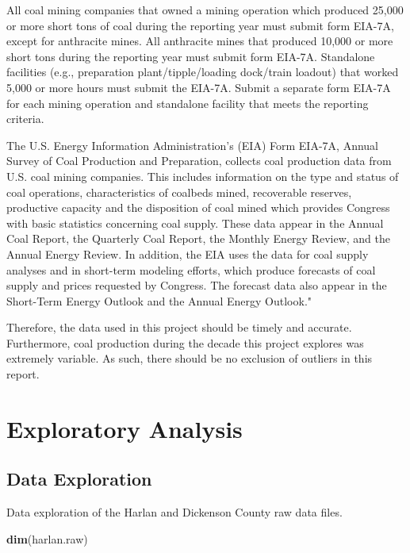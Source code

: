 \documentclass[12pt,]{article}
\newenvironment{Shaded}{\begin{snugshade}}{\end{snugshade}}
\newcommand{\KeywordTok}[1]{\textcolor[rgb]{0.13,0.29,0.53}{\textbf{#1}}}
\newcommand{\NormalTok}[1]{#1}
\begin{document}
All coal mining companies that owned a mining operation which produced
25,000 or more short tons of coal during the reporting year must submit
form EIA-7A, except for anthracite mines. All anthracite mines that
produced 10,000 or more short tons during the reporting year must submit
form EIA-7A. Standalone facilities (e.g., preparation
plant/tipple/loading dock/train loadout) that worked 5,000 or more hours
must submit the EIA-7A. Submit a separate form EIA-7A for each mining
operation and standalone facility that meets the reporting criteria.

The U.S. Energy Information Administration's (EIA) Form EIA-7A, Annual
Survey of Coal Production and Preparation, collects coal production data
from U.S. coal mining companies. This includes information on the type
and status of coal operations, characteristics of coalbeds mined,
recoverable reserves, productive capacity and the disposition of coal
mined which provides Congress with basic statistics concerning coal
supply. These data appear in the Annual Coal Report, the Quarterly Coal
Report, the Monthly Energy Review, and the Annual Energy Review. In
addition, the EIA uses the data for coal supply analyses and in
short-term modeling efforts, which produce forecasts of coal supply and
prices requested by Congress. The forecast data also appear in the
Short-Term Energy Outlook and the Annual Energy Outlook."

Therefore, the data used in this project should be timely and accurate.
Furthermore, coal production during the decade this project explores was
extremely variable. As such, there should be no exclusion of outliers in
this report.

\newpage

\hypertarget{exploratory-analysis}{%
\section{Exploratory Analysis}\label{exploratory-analysis}}

\hypertarget{data-exploration}{%
\subsection{Data Exploration}\label{data-exploration}}

Data exploration of the Harlan and Dickenson County raw data files.

\begin{Shaded}
\begin{Highlighting}[]
\KeywordTok{dim}\NormalTok{(harlan.raw)}
\end{Highlighting}
\end{Shaded}
\end{document}
